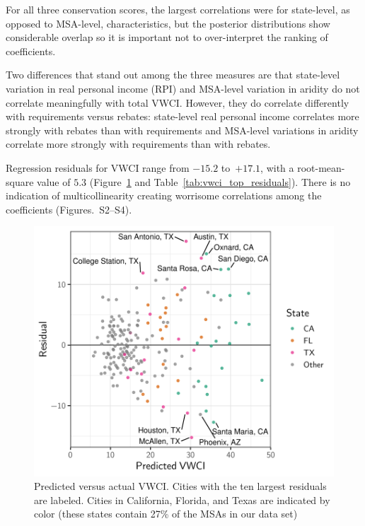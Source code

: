 \documentclass[draft,linenumbers]{agujournal}\usepackage{knitr}
\begin{document}
For all three conservation scores, the largest correlations were for state-level,
as opposed to MSA-level, characteristics, but the posterior distributions show
considerable overlap so it is important not to over-interpret the ranking of
coefficients.

Two differences that stand out among the three measures are that state-level
variation in real personal income (RPI) and MSA-level variation in aridity
do not correlate meaningfully with
total VWCI. However, they do
correlate differently with
requirements versus rebates:
state-level real personal income
correlates more strongly with rebates
than with requirements
and MSA-level variations in aridity
correlate more strongly with requirements
than with rebates.

%
%

Regression residuals for VWCI range
from $-15.2$
to~$+17.1$,
with a root-mean-square value of
$5.3$
(Figure~\ref{fig:vwci_residuals} and Table~\ref{tab:vwci_top_residuals}).
There is no indication of multicollinearity creating worrisome correlations
among the coefficients (Figures.~S2--S4).
%
%
\begin{figure}[tb]

{\centering \includegraphics[width=0.8\linewidth]{figures_clean/vwci_residuals-1} 

}

\caption[Predicted versus actual VWCI]{Predicted versus actual VWCI. Cities with the ten largest residuals are labeled. Cities in California, Florida, and Texas are indicated by color (these states contain 27\% of the MSAs in our data set)}\label{fig:vwci_residuals}
\end{figure}
\end{document}
